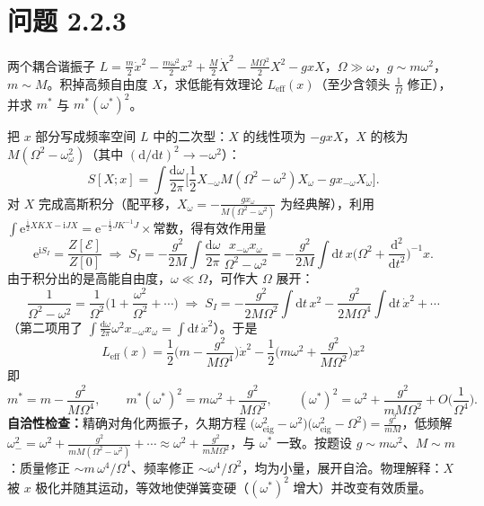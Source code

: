 \section*{问题 2.2.3}
\begin{problem}
两个耦合谐振子 $L=\frac m2\dot x^2-\frac{m\omega^2}2x^2+\frac M2\dot X^2-\frac{M\Omega^2}2X^2-gxX$，$\Omega\gg\omega$，$g\sim m\omega^2$，$m\sim M$。积掉高频自由度 $X$，求低能有效理论 $L_{\mathrm{eff}}(x)$（至少含领头 $\frac1\Omega$ 修正），并求 $m^*$ 与 $m^*(\omega^*)^2$。
\end{problem}
\solution
把 $x$ 部分写成频率空间 $L$ 中的二次型：$X$ 的线性项为 $-gxX$，$X$ 的核为 $M(\Omega^2-\omega_{\omega}^2)$（其中 $(\mathrm{d}/\mathrm{d}t)^2\to-\omega^2$）：
\begin{equation*}
S[X;x]=\int\frac{\mathrm{d}\omega}{2\pi}\Big[\frac12X_{-\omega}M(\Omega^2-\omega^2)X_\omega-gx_{-\omega}X_\omega\Big].
\end{equation*}
对 $X$ 完成高斯积分（配平移，$X_\omega=-\frac{g x_\omega}{M(\Omega^2-\omega^2)}$ 为经典解），利用 $\int\mathrm{e}^{\frac{\mathrm{i}}2XKX-\mathrm{i}JX}=\mathrm{e}^{-\frac{\mathrm{i}}2JK^{-1}J}\times$常数，得有效作用量
\begin{equation*}
\mathrm{e}^{\mathrm{i}S_I}=\frac{Z[\mathcal E]}{Z[0]}\;\Rightarrow\;
S_I=-\frac{g^2}{2M}\int\frac{\mathrm{d}\omega}{2\pi}\,
\frac{x_{-\omega}x_\omega}{\Omega^2-\omega^2}
=-\frac{g^2}{2M}\int\mathrm{d}t\,x\Big(\Omega^2+\frac{\mathrm{d}^2}{\mathrm{d}t^2}\Big)^{-1}x .
\end{equation*}
由于积分出的是高能自由度，$\omega\ll\Omega$，可作大 $\Omega$ 展开：
\begin{equation*}
\frac{1}{\Omega^2-\omega^2}=\frac1{\Omega^2}\Big(1+\frac{\omega^2}{\Omega^2}+\cdots\Big)
\;\Longrightarrow\;
S_I=-\frac{g^2}{2M\Omega^2}\int\mathrm{d}t\,x^2-\frac{g^2}{2M\Omega^4}\int\mathrm{d}t\,\dot x^2+\cdots
\end{equation*}
（第二项用了 $\int\frac{\mathrm{d}\omega}{2\pi}\omega^2x_{-\omega}x_\omega=\int\mathrm{d}t\,\dot x^2$）。于是
\begin{equation*}
\boxed{\;L_{\mathrm{eff}}(x)=\frac12\Big(m-\frac{g^2}{M\Omega^4}\Big)\dot x^2-\frac12\Big(m\omega^2+\frac{g^2}{M\Omega^2}\Big)x^2\;}
\end{equation*}
即
\begin{equation*}
m^*=m-\frac{g^2}{M\Omega^4},
\qquad
m^*(\omega^*)^2=m\omega^2+\frac{g^2}{M\Omega^2},
\qquad
(\omega^*)^2=\omega^2+\frac{g^2}{mM\Omega^2}+O\Big(\frac1{\Omega^4}\Big).
\end{equation*}
\textbf{自洽性检查：}精确对角化两振子，久期方程 $\big(\omega^2_{\text{eig}}-\omega^2\big)\big(\omega^2_{\text{eig}}-\Omega^2\big)=\frac{g^2}{mM}$，低频解 $\omega_-^2=\omega^2+\frac{g^2}{mM(\Omega^2-\omega^2)}+\cdots\approx\omega^2+\frac{g^2}{mM\Omega^2}$，与 $\omega^*$ 一致。按题设 $g\sim m\omega^2$、$M\sim m$：质量修正 $\sim m\,\omega^4/\Omega^4$、频率修正 $\sim\omega^4/\Omega^2$，均为小量，展开自洽。物理解释：$X$ 被 $x$ 极化并随其运动，等效地使弹簧变硬（$(\omega^*)^2$ 增大）并改变有效质量。

